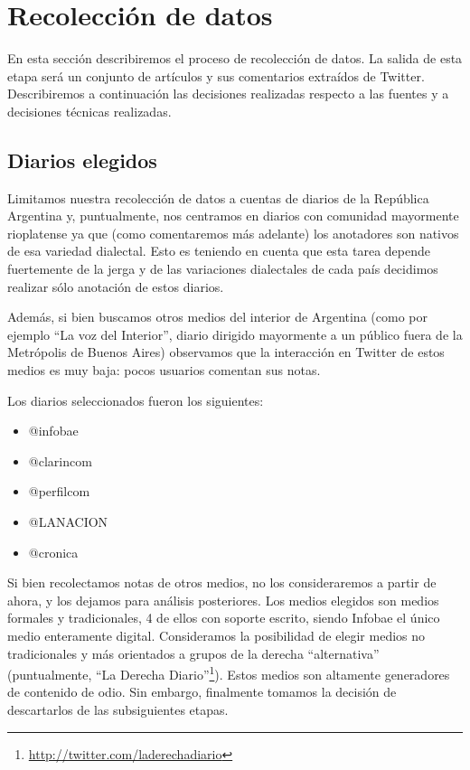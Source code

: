 

\section{Recolección de datos}

En esta sección describiremos el proceso de recolección de datos. La salida de esta etapa será un conjunto de artículos y sus comentarios extraídos de Twitter. Describiremos a continuación las decisiones realizadas respecto a las fuentes y a decisiones técnicas realizadas.

\subsection{Diarios elegidos}

Limitamos nuestra recolección de datos a cuentas de diarios de la República Argentina y, puntualmente, nos centramos en diarios con comunidad mayormente rioplatense ya que (como comentaremos más adelante) los anotadores son nativos de esa variedad dialectal. Esto es teniendo en cuenta que esta tarea depende fuertemente de la jerga y de las variaciones dialectales de cada país decidimos realizar sólo anotación de estos diarios.

Además, si bien buscamos otros medios del interior de Argentina (como por ejemplo ``La voz del Interior'', diario dirigido mayormente a un público fuera de la Metrópolis de Buenos Aires) observamos que la interacción en Twitter de estos medios es muy baja: pocos usuarios comentan sus notas.

Los diarios seleccionados fueron los siguientes:

\begin{itemize}
    \item @infobae
    \item @clarincom
    \item @perfilcom
    \item @LANACION
    \item @cronica
\end{itemize}


Si bien recolectamos notas de otros medios, no los consideraremos a partir de ahora, y los dejamos para análisis posteriores. Los medios elegidos son medios formales y tradicionales, 4 de ellos con soporte escrito, siendo Infobae el único medio enteramente digital. Consideramos la posibilidad de elegir medios no tradicionales y más orientados a grupos de la derecha ``alternativa'' (puntualmente, ``La Derecha Diario''\footnote{\url{http://twitter.com/laderechadiario}}). Estos medios son altamente generadores de contenido de odio. Sin embargo, finalmente tomamos la decisión de descartarlos de las subsiguientes etapas.


